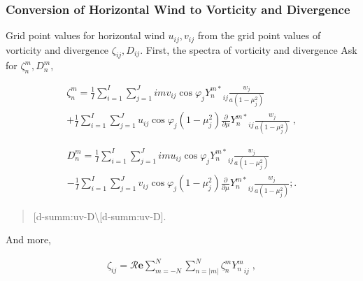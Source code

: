 \hypertarget{conversion-of-horizontal-wind-to-vorticity-and-divergence}{%
\subsubsection{Conversion of Horizontal Wind to Vorticity and
Divergence}\label{conversion-of-horizontal-wind-to-vorticity-and-divergence}}

Grid point values for horizontal wind \(u_{ij}, v_{ij}\) from the grid
point values of vorticity and divergence \(\zeta_{ij}, D_{ij}\). First,
the spectra of vorticity and divergence Ask for \(\zeta_n^m, D_n^m\),

\begin{eqnarray}
\zeta_n^m  =  \frac{1}{I} \sum_{i=1}^{I} \sum_{j=1}^{J}  
                  im v_{ij} \cos\varphi_j {Y_n^{m*}}_{ij}
                \frac{w_j}{a(1-\mu_j^{2})} 
                 \\
           +    \frac{1}{I} \sum_{i=1}^{I} \sum_{j=1}^{J}  
                     u_{ij} \cos\varphi_j (1-\mu_j^2) 
                  \frac{\partial }{\partial \mu} {Y_n^{m*}}_{ij}
                 \frac{w_j}{a(1-\mu_j^{2})} \; ,
\end{eqnarray}

\begin{quote}
\protect\hypertarget{d-summ:uv-zeta}{}{ }
\end{quote}

\begin{eqnarray}
    D_n^m  =  \frac{1}{I} \sum_{i=1}^{I} \sum_{j=1}^{J}  
                  im u_{ij} \cos\varphi_j {Y_n^{m*}}_{ij}
                \frac{w_j}{a(1-\mu_j^{2})} 
                 \\
           -    \frac{1}{I} \sum_{i=1}^{I} \sum_{j=1}^{J}  
                  v_{ij} \cos\varphi_j  (1-\mu_j^2) 
                  \frac{\partial }{\partial \mu} {Y_n^{m*}}_{ij}
                 \frac{w_j}{a(1-\mu_j^{2})} ; .
\end{eqnarray}

\begin{quote}
\protect\hypertarget{d-summ:uv-D}{}{{[}d-summ:uv-D\textbackslash{[}d-summ:uv-D{]}}.
\end{quote}

And more,

\begin{eqnarray}
  \zeta_{ij} 
   =  {\mathcal R}\mathbf{e} \sum_{m=-N}^{N} \sum_{n=|m|}^{N} 
      \zeta_n^m  {Y_n^m}_{ij} \; ,
\end{eqnarray}

